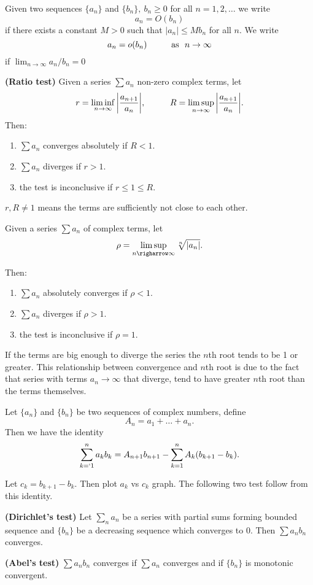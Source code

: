 \documentclass[10pt,a4paper]{book}
\begin{document}
\begin{deff}
Given two sequences $\{a_n\}$ and $\{b_n\},\ b_n \geq 0$ for all $n = 1,2, \dots$ we write 
$$a_n = O(b_n)$$
if there exists a constant $M>0$ such that $|a_n| \leq Mb_n$ for all $n$. We write
$$a_n = o(b_n)\sp \text{as }\ n\rightarrow \infty$$
if $\lim_{n \rightarrow \infty} a_n/b_n = 0$
\end{deff}
\begin{Thm}
\textbf{(Ratio test)}
Given a series $\sum a_n$ non-zero complex terms, let
$$ r = \liminf_{n \rightarrow \infty} \bigg| \dfrac{a_{n+1}}{a_n}\bigg|,
\sp R=  \limsup_{n \rightarrow \infty} \bigg| \dfrac{a_{n+1}}{a_n}\bigg|.$$
Then:
\begin{enumerate}
\item $\sum a_n$ converges absolutely if $R<1$.
\item $\sum a_n$ diverges if $ r> 1$.
\item the test is inconclusive if $ r \leq 1 \leq R$.
\end{enumerate}
\end{Thm}
\PP $r, R\neq 1$ means the terms are sufficiently not close to each other.
\begin{Thm}
Given a series $\sum a_n$ of complex terms, let
$$\rho = \limsup_{n\righarrow \infty} \sqrt[n]{|a_n|}.$$

Then:
\begin{enumerate}
\item $\sum{a_n}$  absolutely converges if $\rho < 1$.
\item $\sum{a_n}$ diverges if $\rho > 1$.
\item the test is inconclusive if $ \rho = 1$.
\end{enumerate}

\end{Thm}
\PP If the terms are big enough to diverge the series the $n$th root tends to be 1 or greater. This relationship between convergence and $n$th root is due to the fact that series with terms $a_n \rightarrow \infty$ that diverge, tend to have greater $n$th root than the terms themselves.

\begin{Thm}
Let $\{a_n\}$ and $\{b_n\}$ be two sequences of complex numbers, define
$$A_n = a_1 + \dots + a_n.$$
Then we have the identity
$$\sum_{k=`1}^na_kb_k = A_{n+1}b_{n+1}- \sum_{k =1 }^n A_k(b_{k+1} - b_k).$$

\end{Thm}
\PP Let $c_k = b_{k+1}- b_k$. Then plot $a_k$ vs $c_k$ graph. The following two test follow from this identity.
\begin{Thm}
\textbf{(Dirichlet's test)} Let $\sum_n a_n$ be a series with partial sums forming bounded sequence and $\{b_n\}$ be a decreasing sequence which converges to $0$. Then $\sum a_nb_n$ converges.
\end{Thm}
\begin{Thm}
\textbf{(Abel's test)} $\sum a_nb_n$ converges if $\sum a_n$ converges and if $\{b_n\}$ is monotonic convergent.
\end{Thm}
\end{document}
